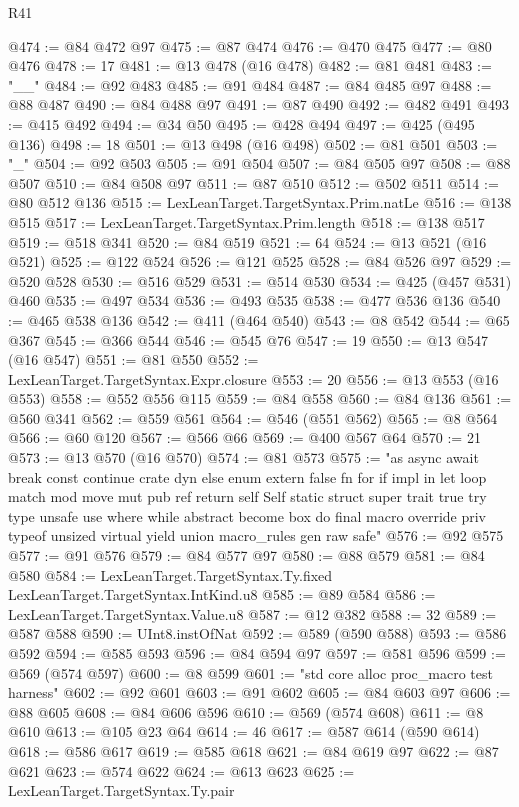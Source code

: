 \begin{lexlean}{R41}
\begin{coremodule}
{{{{{{{{{{{{{{{{{{{{{{{{{{{{{{{{{{{{{{{{{{{{{{{{{{{{{{{{{{{{{{{{{{{{{{{{{{{{{{{{{{{{{{{@474 := @84 @472 @97
@475 := @87 @474
@476 := @470 @475
@477 := @80 @476
@478 := 17
@481 := @13 @478 (@16 @478)
@482 := @81 @481
@483 := "__"
@484 := @92 @483
@485 := @91 @484
@487 := @84 @485 @97
@488 := @88 @487
@490 := @84 @488 @97
@491 := @87 @490
@492 := @482 @491
@493 := @415 @492
@494 := @34 @50
@495 := @428 @494
@497 := @425 (@495 @136)
@498 := 18
@501 := @13 @498 (@16 @498)
@502 := @81 @501
@503 := "_"
@504 := @92 @503
@505 := @91 @504
@507 := @84 @505 @97
@508 := @88 @507
@510 := @84 @508 @97
@511 := @87 @510
@512 := @502 @511
@514 := @80 @512 @136
@515 := LexLeanTarget.TargetSyntax.Prim.natLe
@516 := @138 @515
@517 := LexLeanTarget.TargetSyntax.Prim.length
@518 := @138 @517
@519 := @518 @341
@520 := @84 @519
@521 := 64
@524 := @13 @521 (@16 @521)
@525 := @122 @524
@526 := @121 @525
@528 := @84 @526 @97
@529 := @520 @528
@530 := @516 @529
@531 := @514 @530
@534 := @425 (@457 @531) @460
@535 := @497 @534
@536 := @493 @535
@538 := @477 @536 @136
@540 := @465 @538 @136
@542 := @411 (@464 @540)
@543 := @8 @542
@544 := @65 @367
@545 := @366 @544
@546 := @545 @76
@547 := 19
@550 := @13 @547 (@16 @547)
@551 := @81 @550
@552 := LexLeanTarget.TargetSyntax.Expr.closure
@553 := 20
@556 := @13 @553 (@16 @553)
@558 := @552 @556 @115
@559 := @84 @558
@560 := @84 @136
@561 := @560 @341
@562 := @559 @561
@564 := @546 (@551 @562)
@565 := @8 @564
@566 := @60 @120
@567 := @566 @66
@569 := @400 @567 @64
@570 := 21
@573 := @13 @570 (@16 @570)
@574 := @81 @573
@575 := "as async await break const continue crate dyn else enum extern false fn for if impl in let loop match mod move mut pub ref return self Self static struct super trait true try type unsafe use where while abstract become box do final macro override priv typeof unsized virtual yield union macro_rules gen raw safe"
@576 := @92 @575
@577 := @91 @576
@579 := @84 @577 @97
@580 := @88 @579
@581 := @84 @580
@584 := LexLeanTarget.TargetSyntax.Ty.fixed LexLeanTarget.TargetSyntax.IntKind.u8
@585 := @89 @584
@586 := LexLeanTarget.TargetSyntax.Value.u8
@587 := @12 @382
@588 := 32
@589 := @587 @588
@590 := UInt8.instOfNat
@592 := @589 (@590 @588)
@593 := @586 @592
@594 := @585 @593
@596 := @84 @594 @97
@597 := @581 @596
@599 := @569 (@574 @597)
@600 := @8 @599
@601 := "std core alloc proc_macro test harness"
@602 := @92 @601
@603 := @91 @602
@605 := @84 @603 @97
@606 := @88 @605
@608 := @84 @606 @596
@610 := @569 (@574 @608)
@611 := @8 @610
@613 := @105 @23 @64
@614 := 46
@617 := @587 @614 (@590 @614)
@618 := @586 @617
@619 := @585 @618
@621 := @84 @619 @97
@622 := @87 @621
@623 := @574 @622
@624 := @613 @623
@625 := LexLeanTarget.TargetSyntax.Ty.pair
}}}}}}}}}}}}}}}}}}}}}}}}}}}}}}}}}}}}}}}}}}}}}}}}}}}}}}}}}}}}}}}}}}}}}}}}}}}}}}}}}}}}}}}
\end{coremodule}
\end{lexlean}
